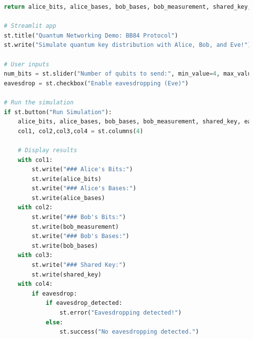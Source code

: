 \documentclass[12pt]{ieeetj}
\begin{document}
\begin{lstlisting}[language=Python, caption= Interactive eavesdropping demo for bb84, label=code:iedbb84]
    return alice_bits, alice_bases, bob_bases, bob_measurement, shared_key, eavesdrop_detected

# Streamlit app
st.title("Quantum Networking Demo: BB84 Protocol")
st.write("Simulate quantum key distribution with Alice, Bob, and Eve!")

# User inputs
num_bits = st.slider("Number of qubits to send:", min_value=4, max_value=20, value=8)
eavesdrop = st.checkbox("Enable eavesdropping (Eve)")

# Run the simulation
if st.button("Run Simulation"):
    alice_bits, alice_bases, bob_bases, bob_measurement, shared_key, eavesdrop_detected = bb84_protocol(num_bits, eavesdrop)
    col1, col2,col3,col4 = st.columns(4)

    # Display results
    with col1:
        st.write("### Alice's Bits:")
        st.write(alice_bits)
        st.write("### Alice's Bases:")
        st.write(alice_bases)
    with col2:
        st.write("### Bob's Bits:")
        st.write(bob_measurement)
        st.write("### Bob's Bases:")
        st.write(bob_bases)
    with col3:
        st.write("### Shared Key:")
        st.write(shared_key)
    with col4:
        if eavesdrop:
            if eavesdrop_detected:
                st.error("Eavesdropping detected!")
            else:
                st.success("No eavesdropping detected.")


\end{lstlisting}
\end{document}
